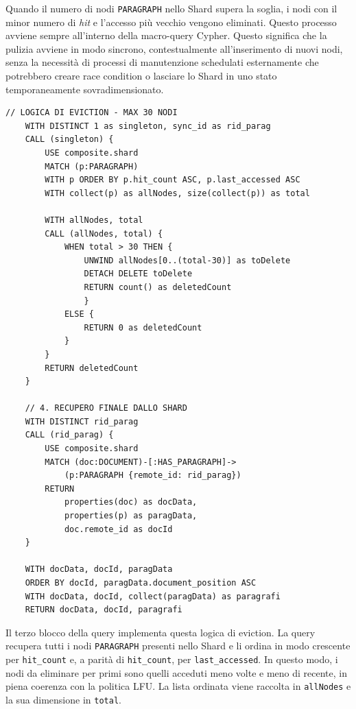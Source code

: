 Quando il numero di nodi \texttt{PARAGRAPH} nello Shard supera la soglia, i nodi con il minor numero di \textit{hit} e l'accesso più vecchio vengono eliminati. Questo processo avviene sempre all'interno della macro-query Cypher. Questo significa che la pulizia avviene in modo sincrono, contestualmente all'inserimento di nuovi nodi, senza la necessità di processi di manutenzione schedulati esternamente che potrebbero creare race condition o lasciare lo Shard in uno stato temporaneamente sovradimensionato.

\newpage

\begin{lstlisting}[language=Cypher, caption={Logica di Eviction basata su LFU e recupero finale}, label=lst:eviction]
    // LOGICA DI EVICTION - MAX 30 NODI
    WITH DISTINCT 1 as singleton, sync_id as rid_parag
    CALL (singleton) {
        USE composite.shard
        MATCH (p:PARAGRAPH)
        WITH p ORDER BY p.hit_count ASC, p.last_accessed ASC
        WITH collect(p) as allNodes, size(collect(p)) as total

        WITH allNodes, total
        CALL (allNodes, total) {
            WHEN total > 30 THEN {
                UNWIND allNodes[0..(total-30)] as toDelete
                DETACH DELETE toDelete
                RETURN count() as deletedCount
                }
            ELSE {
                RETURN 0 as deletedCount
            }
        }
        RETURN deletedCount
    }

    // 4. RECUPERO FINALE DALLO SHARD
    WITH DISTINCT rid_parag
    CALL (rid_parag) {
        USE composite.shard
        MATCH (doc:DOCUMENT)-[:HAS_PARAGRAPH]->
            (p:PARAGRAPH {remote_id: rid_parag})
        RETURN
            properties(doc) as docData,
            properties(p) as paragData,
            doc.remote_id as docId
    }

    WITH docData, docId, paragData
    ORDER BY docId, paragData.document_position ASC
    WITH docData, docId, collect(paragData) as paragrafi
    RETURN docData, docId, paragrafi
\end{lstlisting}

\vspace{1.5em}

Il terzo blocco della query implementa questa logica di eviction. La query recupera tutti i nodi \texttt{PARAGRAPH} presenti nello Shard e li ordina in modo crescente per \texttt{hit\_count} e, a parità di \texttt{hit\_count}, per \texttt{last\_accessed}. In questo modo, i nodi da eliminare per primi sono quelli acceduti meno volte e meno di recente, in piena coerenza con la politica LFU. La lista ordinata viene raccolta in \texttt{allNodes} e la sua dimensione in \texttt{total}.

